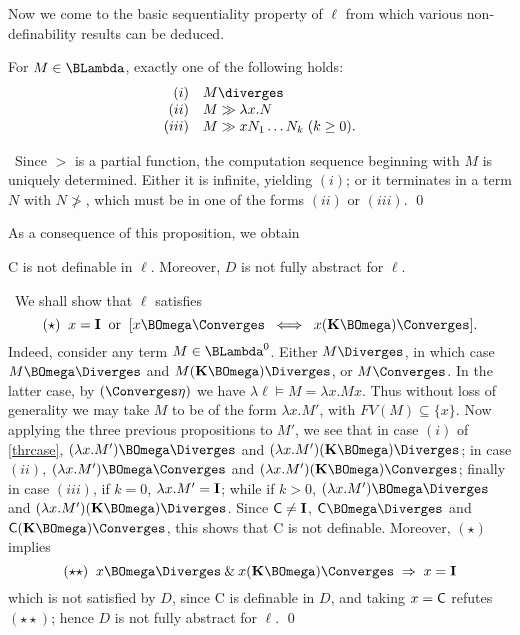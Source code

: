 Now we come to the basic sequentiality property of $\ell$ from which various non-definability results can be deduced.

\begin{proposition} 
\label{thrcase}
For $M \in \BLambda$, exactly one of the following holds:
\[ \begin{array}{rl}
(i) & M \diverges \\
(ii) & M \gg \lambda x . N \\
(iii) & M \gg x N_{1} \ldots N_{k} \; (k \geq 0 ) .
\end{array} \]
\end{proposition}

\proof\ Since $>$ is a partial function, the computation sequence beginning with $M$ is uniquely determined. Either it is infinite, yielding $(i)$; or it terminates in a term $N$ with $ N \not>$, which must be in one of the forms $(ii)$ or $(iii)$. \qed

As a consequence of this proposition, we obtain

\begin{theorem}
\label{Cundef}
{\sf C} is not definable in $\ell$. Moreover, $D$ is not fully abstract for $\ell$.
\end{theorem}

\proof\ We shall show that $\ell$ satisfies
\[ (\star ) \;\; x = {\bf I} \;\; \mbox{or} \;\; [x \BOmega \Converges \;\; \Longleftrightarrow \;\; x ({\bf K} \BOmega ) \Converges ] . \]
Indeed, consider any term $M \in {\BLambda}^{0}$. 
Either $M \Diverges$, in which case $M \BOmega \Diverges $ and $M ( {\bf K} \BOmega ) \Diverges $, or $M \Converges$. 
In the latter case, by $(\Converges \eta )$ we have $\lambda \ell \models M = \lambda x . M x$. 
Thus without loss of generality we may take $M$ to be of the form $\lambda x . M'$, with $FV(M) \subseteq \{ x \}$. 
Now applying the three previous propositions to $M'$, we see that in case $(i)$ of \ref{thrcase}, $(\lambda x . M' ) \BOmega \Diverges$ and 
$(\lambda x . M' ) ({\bf K} \BOmega ) \Diverges$; 
in case $(ii)$, $(\lambda x . M' ) \BOmega \Converges$ and $(\lambda x . M' ) ({\bf K} \BOmega ) \Converges$; 
finally in case $(iii)$, if $k = 0$, $\lambda x . M' = {\bf I}$; 
while if $k > 0$, $(\lambda x . M' ) \BOmega \Diverges$ and $(\lambda x . M' ) ({\bf K} \BOmega ) \Diverges$. 
Since ${\sf C} \not= {\bf I}$, ${\sf C} \BOmega \Diverges$ and ${\sf C} ( {\bf K} \BOmega ) \Converges$, this shows that {\sf C} is not definable. 
Moreover, $(\star )$ implies
\[ (\star \star ) \;\;  x \BOmega \Diverges \: \& \: x ( {\bf K} \BOmega ) \Converges \; \Rightarrow \; x = {\bf I} \]
which is not satisfied by $D$, since {\sf C} is definable in $D$, and taking $x = {\sf C}$ refutes $(\star \star )$; hence $D$ is not fully abstract for $\ell$. \qed

